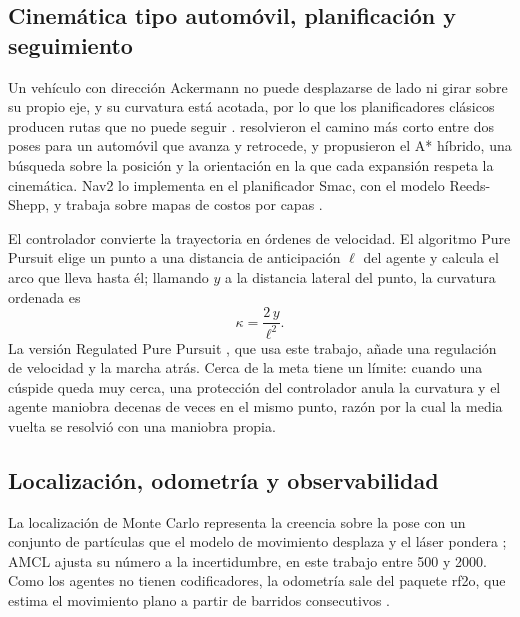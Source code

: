 \subsection{Cinemática tipo automóvil, planificación y seguimiento}

Un vehículo con dirección Ackermann no puede desplazarse de lado ni girar sobre su propio eje, y su curvatura está acotada, por lo que los planificadores clásicos producen rutas que no puede seguir \autocite{macenski2024smac}. \textcite{reeds1990optimal} resolvieron el camino más corto entre dos poses para un automóvil que avanza y retrocede, y \textcite{dolgov2010path} propusieron el A* híbrido, una búsqueda sobre la posición y la orientación en la que cada expansión respeta la cinemática. Nav2 \autocite{macenski2020marathon} lo implementa en el planificador Smac, con el modelo Reeds-Shepp, y trabaja sobre mapas de costos por capas \autocite{macenski2023survey}.

El controlador convierte la trayectoria en órdenes de velocidad. El algoritmo Pure Pursuit elige un punto a una distancia de anticipación $\ell$ del agente y calcula el arco que lleva hasta él; llamando $y$ a la distancia lateral del punto, la curvatura ordenada es
\begin{equation}
  \kappa = \frac{2\,y}{\ell^{2}} .
\end{equation}
La versión Regulated Pure Pursuit \autocite{macenski2023rpp}, que usa este trabajo, añade una regulación de velocidad y la marcha atrás. Cerca de la meta tiene un límite: cuando una cúspide queda muy cerca, una protección del controlador anula la curvatura y el agente maniobra decenas de veces en el mismo punto, razón por la cual la media vuelta se resolvió con una maniobra propia.

\subsection{Localización, odometría y observabilidad}

La localización de Monte Carlo representa la creencia sobre la pose con un conjunto de partículas que el modelo de movimiento desplaza y el láser pondera \autocite{thrun2005probabilistic}; AMCL ajusta su número a la incertidumbre, en este trabajo entre 500 y 2000. Como los agentes no tienen codificadores, la odometría sale del paquete rf2o, que estima el movimiento plano a partir de barridos consecutivos \autocite{jaimez2016planar}.

